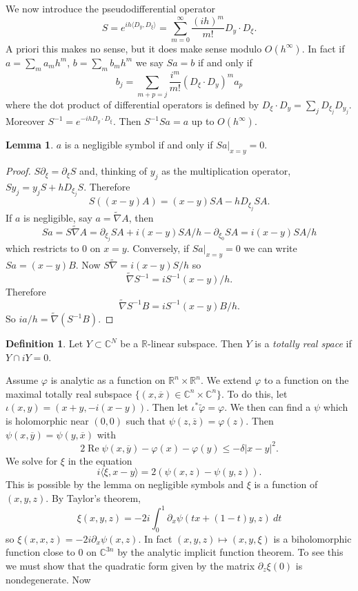 \documentclass[12pt]{report}
\newcommand{\RR}{\mathbb{R}}
\newcommand{\CC}{\mathbb{C}}
\renewcommand{\Re}{\operatorname{Re}}
\newcommand{\dfn}[1]{\emph{#1}\index{#1}}
\theoremstyle{definition}
\newtheorem{lemma}[theorem]{Lemma}
\newtheorem{definition}[theorem]{Definition}
\begin{document}
    We now introduce the pseudodifferential operator
    $$S = e^{ih\langle D_y, D_\xi\rangle} = \sum_{m=0}^\infty \frac{(ih)^m}{m!} D_y \cdot D_\xi.$$
    A priori this makes no sense, but it does make sense modulo $O(h^\infty)$. In fact if $a = \sum_m a_m h^m$, $b = \sum_m b_m h^m$ we say $Sa = b$ if and only if
    $$b_j = \sum_{m+p = j} \frac{i^m}{m!}(D_\xi \cdot D_y)^m a_p$$
    where the dot product of differential operators is defined by $D_\xi \cdot D_y = \sum_j D_{\xi_j}D_{y_j}$. Moreover $S^{-1} = e^{-ihD_y\cdot D_\xi}$. Then $S^{-1}Sa = a$ up to $O(h^\infty)$. 
\begin{lemma}
    $a$ is a negligible symbol if and only if $Sa|_{x = y} = 0$.
\end{lemma}
\begin{proof}
    $S\partial_\xi = \partial_\xi S$ and, thinking of $y_j$ as the multiplication operator, $Sy_j = y_jS + hD_{\xi_j}S$. Therefore
    $$S((x-y)A) = (x-y)SA - hD_{\xi_j}SA.$$
    If $a$ is negligible, say $a = \tilde \nabla A$, then
    $$Sa = S\tilde \nabla A = \partial_{\xi_j}SA + i(x-y)SA/h - \partial_{\xi_0}SA = i(x-y)SA/h$$
    which restricts to $0$ on $x=y$. Conversely, if $Sa|_{x=y} = 0$ we can write $Sa = (x-y)B$. Now $S\tilde \nabla = i(x-y)S/h$ so
    $$\tilde \nabla S^{-1} = iS^{-1}(x-y)/h.$$
    Therefore
    $$\tilde \nabla S^{-1}B = iS^{-1}(x-y)B/h.$$
    So $ia/h = \tilde \nabla(S^{-1}B)$.
\end{proof}
\begin{definition}
    Let $Y \subset \CC^N$ be a $\RR$-linear subspace. Then $Y$ is a \dfn{totally real space} if $Y \cap iY = 0$.
\end{definition}
    Assume $\varphi$ is analytic as a function on $\RR^n \times \RR^n$. We extend $\varphi$ to a function on the maximal totally real subspace $\{(x, \overline x) \in \CC^n \times \CC^n\}$. To do this, let $\iota(x, y) = (x + y, -i(x - y))$. Then let $\iota^*\tilde \varphi = \varphi$. We then can find a $\psi$ which is holomorphic near $(0, 0)$ such that $\psi(z, \overline z) = \varphi(z)$. Then $\psi(x, \overline y) = \psi(y, \overline x)$ with
    $$2 \Re \psi(x, \overline y) - \varphi(x) - \varphi(y) \leq -\delta|x - y|^2.$$
    We solve for $\xi$ in the equation
    $$i\langle \xi, x - y\rangle = 2(\psi(x, z) - \psi(y, z)).$$
    This is possible by the lemma on negligible symbols and $\xi$ is a function of $(x, y, z)$. By Taylor's theorem,
    $$\xi(x, y, z) = -2i\int_0^1 \partial_x \psi(tx + (1-t)y, z) ~dt$$
    so $\xi(x, x, z) = -2i\partial_x \psi(x, z)$. In fact $(x, y, z) \mapsto (x, y, \xi)$ is a biholomorphic function close to $0$ on $\CC^{3n}$ by the analytic implicit function theorem. To see this we must show that the quadratic form given by the matrix $\partial_z \xi(0)$ is nondegenerate. Now
\end{document}
